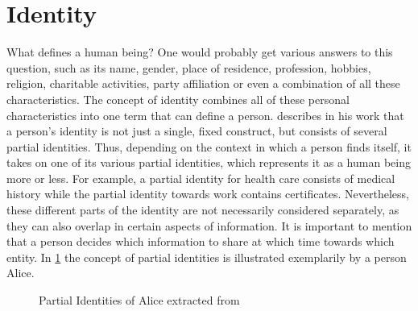 
    \section{Identity}

    What defines a human being? One would probably get various answers to this question, such as its name, gender, place of residence, profession, hobbies, religion, charitable activities, party affiliation or even a combination of all these characteristics. The concept of identity combines all of these personal characteristics into one term that can define a person. \cite[p. 206]{claus_identity_2001} describes in his work that a person's identity is not just a single, fixed construct, but consists of several partial identities. Thus, depending on the context in which a person finds itself, it takes on one of its various partial identities, which represents it as a human being more or less. For example, a partial identity for health care consists of medical history while the partial identity towards work contains certificates. Nevertheless, these different parts of the identity are not necessarily considered separately, as they can also overlap in certain aspects of information. It is important to mention that a person decides which information to share at which time towards which entity. In \ref{figure: alice} the concept of partial identities is illustrated exemplarily by a person Alice.
    
    \begin{figure}[ht]
        \centering
        \caption{Partial Identities of Alice extracted from \cite{claus_identity_2001}}
        \label{figure: alice}
    \end{figure}

